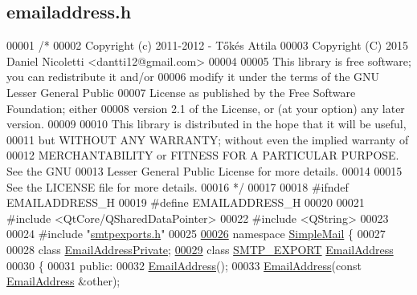 \hypertarget{emailaddress_8h_source}{}\subsection{emailaddress.\+h}
\label{emailaddress_8h_source}

\begin{DoxyCode}
00001 \textcolor{comment}{/*}
00002 \textcolor{comment}{  Copyright (c) 2011-2012 - Tőkés Attila}
00003 \textcolor{comment}{  Copyright (C) 2015 Daniel Nicoletti <dantti12@gmail.com>}
00004 \textcolor{comment}{}
00005 \textcolor{comment}{  This library is free software; you can redistribute it and/or}
00006 \textcolor{comment}{  modify it under the terms of the GNU Lesser General Public}
00007 \textcolor{comment}{  License as published by the Free Software Foundation; either}
00008 \textcolor{comment}{  version 2.1 of the License, or (at your option) any later version.}
00009 \textcolor{comment}{}
00010 \textcolor{comment}{  This library is distributed in the hope that it will be useful,}
00011 \textcolor{comment}{  but WITHOUT ANY WARRANTY; without even the implied warranty of}
00012 \textcolor{comment}{  MERCHANTABILITY or FITNESS FOR A PARTICULAR PURPOSE.  See the GNU}
00013 \textcolor{comment}{  Lesser General Public License for more details.}
00014 \textcolor{comment}{}
00015 \textcolor{comment}{  See the LICENSE file for more details.}
00016 \textcolor{comment}{*/}
00017 
00018 \textcolor{preprocessor}{#ifndef EMAILADDRESS\_H}
00019 \textcolor{preprocessor}{#define EMAILADDRESS\_H}
00020 
00021 \textcolor{preprocessor}{#include <QtCore/QSharedDataPointer>}
00022 \textcolor{preprocessor}{#include <QString>}
00023 
00024 \textcolor{preprocessor}{#include "\hyperlink{smtpexports_8h}{smtpexports.h}"}
00025 
\hyperlink{namespace_simple_mail}{00026} \textcolor{keyword}{namespace }\hyperlink{namespace_simple_mail}{SimpleMail} \{
00027 
00028 \textcolor{keyword}{class }\hyperlink{class_simple_mail_1_1_email_address_private}{EmailAddressPrivate};
\hyperlink{class_simple_mail_1_1_email_address}{00029} \textcolor{keyword}{class }\hyperlink{smtpexports_8h_ac580c9660cb24a34b13807f4eb0e1bd0}{SMTP\_EXPORT} \hyperlink{class_simple_mail_1_1_email_address}{EmailAddress}
00030 \{
00031 \textcolor{keyword}{public}:
00032     \hyperlink{class_simple_mail_1_1_email_address}{EmailAddress}();
00033     \hyperlink{class_simple_mail_1_1_email_address}{EmailAddress}(\textcolor{keyword}{const} \hyperlink{class_simple_mail_1_1_email_address}{EmailAddress} &other);

\end{DoxyCode}
